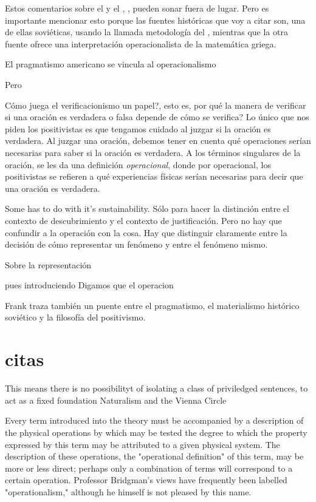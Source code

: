 Estos comentarios sobre el  y el ,
, pueden sonar fuera de lugar.
Pero es importante mencionar esto porque las fuentes históricas que voy a citar son, una de ellas soviéticas, usando la llamada metodología del , mientras que la otra fuente ofrece una interpretación operacionalista de la matemática griega.

El pragmatismo americano se vincula al operacionalismo

Pero

Cómo juega el verificacionismo un papel?, esto es, por qué la manera de verificar si una oración es verdadera o falsa depende de cómo se verifica?
Lo único que nos piden los positivistas es que tengamos cuidado al juzgar si la oración es verdadera.
Al juzgar una oración, debemos tener en cuenta qué operaciones serían necesarias para saber si la oración es verdadera.
A los términos singulares de la oración, se les da una definición \emph{operacional}, donde por operacional, los positivistas se refieren a qué experiencias físicas serían necesarias para decir que una oración es verdadera.

Some has to do with it's sustainability.
Sólo para hacer la distinción entre el contexto de descubrimiento y el contexto de justificación.
Pero no hay que confundir a la operación con la cosa.
Hay que distinguir claramente entre la decisión de cómo representar un fenómeno y entre el fenómeno mismo.

Sobre la representación

pues introduciendo
Digamos que el operacion

Frank traza también un puente entre el pragmatismo, el materialismo histórico soviético y la filosofía del positivismo.


\section{citas}

This means there is no possibilityt of isolating a class of priviledged sentences, to act as a fixed foundation Naturalism and the Vienna Circle

Every term  introduced into the theory must be accompanied by  a description of the physical operations by which may  be tested the degree to which the property expressed  by this term may be attributed to a given physical  system. The description of these operations, the  "operational definition" of this term, may be more or  less direct; perhaps only a combination of terms will  correspond to a certain operation. Professor Bridgman's views have frequently been labelled "operationalism," although he himself is not pleased by this name.

